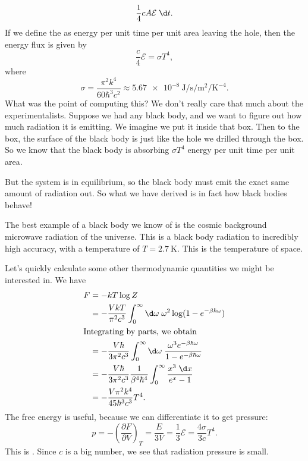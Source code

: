 \documentclass[a4paper]{article}
\begin{document}
\[
  \frac{1}{4} cA \mathcal{E} \;\d t.
\]
If we define the  as energy per unit time per unit area leaving the hole, then the energy flux is given by
\[
  \frac{c}{4} \mathcal{E} = \sigma T^4,
\]
where
\[
  \sigma = \frac{\pi^2 k^4}{60 \hbar^3 c^2} \approx \SI{5.67e-8}{\joule\per\second\per\meter\squared\per\kelvin\tothe{-4}}.
\]
What was the point of computing this? We don't really care that much about the experimentalists. Suppose we had any black body, and we want to figure out how much radiation it is emitting. We imagine we put it inside that box. Then to the box, the surface of the black body is just like the hole we drilled through the box. So we know that the black body is absorbing $\sigma T^4$ energy per unit time per unit area.

But the system is in equilibrium, so the black body must emit the exact same amount of radiation out. So what we have derived is in fact how black bodies behave!

The best example of a black body we know of is the cosmic background microwave radiation of the universe. This is a black body radiation to incredibly high accuracy, with a temperature of $T = \SI{2.7}{\kelvin}$. This is the temperature of space.

Let's quickly calculate some other thermodynamic quantities we might be interested in. We have
\begin{align*}
  F &= - kT \log Z\\
  &= -\frac{VkT}{\pi^2 c^3}\int_0^\infty \d \omega\; \omega^2 \log (1 - e^{-\beta \hbar \omega})\\
  \intertext{Integrating by parts, we obtain}
  &= -\frac{V \hbar}{3\pi^2 c^3}\int_0^\infty \d \omega\; \frac{\omega^3 e^{-\beta \hbar \omega}}{1 - e^{-\beta \hbar \omega}}\\
  &= - \frac{V \hbar}{3\pi^2 c^3} \frac{1}{\beta^4 \hbar^4} \int_0^\infty \frac{x^3 \;\d x}{e^x - 1} \\
  &= - \frac{V \pi^2 k^4}{45 \hbar^3 c^3}T^4.
\end{align*}
The free energy is useful, because we can differentiate it to get pressure:
\[
  p = - \left(\frac{\partial F}{\partial V}\right)_T = \frac{E}{3V} = \frac{1}{3}\mathcal{E} = \frac{4\sigma}{3c} T^4.
\]
This is . Since $c$ is a big number, we see that radiation pressure is small.
\end{document}
